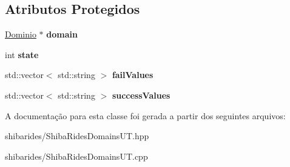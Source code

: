 \subsection*{Atributos Protegidos}
\begin{DoxyCompactItemize}
\item 
\hyperlink{classshibarides_1_1Dominio}{Dominio} $\ast$ {\bfseries domain}\hypertarget{classshibarides_1_1TUDominio_afbbf2e1d69e2a78b6d493521eb1a897f}{}\label{classshibarides_1_1TUDominio_afbbf2e1d69e2a78b6d493521eb1a897f}

\item 
int {\bfseries state}\hypertarget{classshibarides_1_1TUDominio_abfc3febebd253f31304997ea2715ac48}{}\label{classshibarides_1_1TUDominio_abfc3febebd253f31304997ea2715ac48}

\item 
std\+::vector$<$ std\+::string $>$ {\bfseries fail\+Values}\hypertarget{classshibarides_1_1TUDominio_ac1c9d98bd0e659ede32711ac693d6276}{}\label{classshibarides_1_1TUDominio_ac1c9d98bd0e659ede32711ac693d6276}

\item 
std\+::vector$<$ std\+::string $>$ {\bfseries success\+Values}\hypertarget{classshibarides_1_1TUDominio_a93df3635be9b1cd0726f5f1427a7b414}{}\label{classshibarides_1_1TUDominio_a93df3635be9b1cd0726f5f1427a7b414}

\end{DoxyCompactItemize}


A documentação para esta classe foi gerada a partir dos seguintes arquivos\+:\begin{DoxyCompactItemize}
\item 
shibarides/Shiba\+Rides\+Domains\+U\+T.\+hpp\item 
shibarides/Shiba\+Rides\+Domains\+U\+T.\+cpp\end{DoxyCompactItemize}
